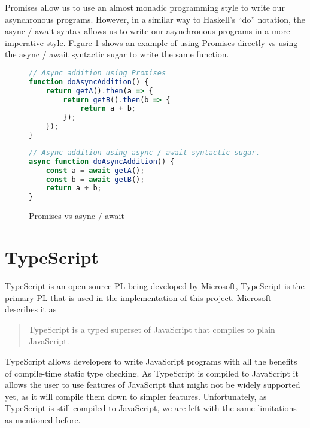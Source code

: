 Promises allow us to use an almost monadic programming style to write our asynchronous programs. However, in a similar way to Haskell's ``do'' notation, the async / await syntax allows us to write our asynchronous programs in a more imperative style. Figure \ref{background:figure:async-await} shows an example of using Promises directly vs using the async / await syntactic sugar to write the same function.

\begin{figure}
    \caption{Promises vs async / await}
    \label{background:figure:async-await}
    \begin{minipage}[t]{0.45\textwidth}
        \begin{lstlisting}[language=javascript]
// Async addition using Promises
function doAsyncAddition() {
    return getA().then(a => {
        return getB().then(b => {
            return a + b;
        });
    });
}
        \end{lstlisting}
    \end{minipage}
    \begin{minipage}[t]{0.45\textwidth}
        \begin{lstlisting}[language=javascript]
// Async addition using async / await syntactic sugar.
async function doAsyncAddition() {
    const a = await getA();
    const b = await getB();
    return a + b;
}
        \end{lstlisting}
    \end{minipage}
\end{figure}

\section{TypeScript}
TypeScript is an open-source PL being developed by Microsoft, TypeScript is the primary PL that is used in the implementation of this project. Microsoft describes it as

\begin{quote}
TypeScript is a typed superset of JavaScript that compiles to plain JavaScript.\cite{microsoftts}
\end{quote}

TypeScript allows developers to write JavaScript programs with all the benefits of compile-time static type checking. As TypeScript is compiled to JavaScript it allows the user to use features of JavaScript that might not be widely supported yet, as it will compile them down to simpler features. Unfortunately, as TypeScript is still compiled to JavaScript, we are left with the same limitations as mentioned before.


